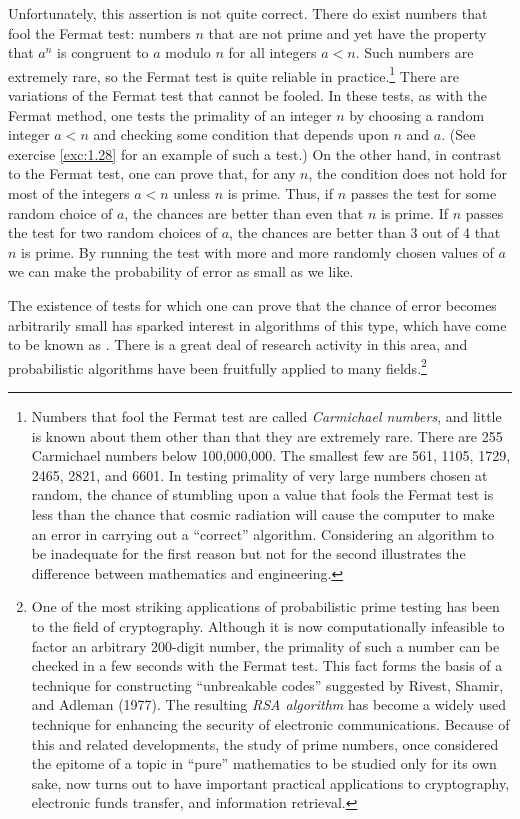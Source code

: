 Unfortunately, this assertion is not quite correct.  There do exist
numbers that fool the Fermat test: numbers $n$ that are not prime and
yet have the property that $a^n$ is congruent to $a$ modulo $n$ for
all integers $a < n$.  Such numbers are extremely rare, so the Fermat
test is quite reliable in practice.\footnote{\label{fn:1.47}Numbers
  that fool the Fermat test are called \textit{Carmichael numbers},
  and little is known about them other than that they are extremely
  rare.  There are 255 Carmichael numbers below 100,000,000.  The
  smallest few are 561, 1105, 1729, 2465, 2821, and 6601.  In testing
  primality of very large numbers chosen at random, the chance of
  stumbling upon a value that fools the Fermat test is less than the
  chance that cosmic radiation will cause the computer to make an
  error in carrying out a ``correct'' algorithm.  Considering an
  algorithm to be inadequate for the first reason but not for the
  second illustrates the difference between mathematics and
  engineering.}  There are variations of the Fermat test that cannot
be fooled.  In these tests, as with the Fermat method, one tests the
primality of an integer $n$ by choosing a random integer $a < n$ and
checking some condition that depends upon $n$ and $a$.  (See exercise
\ref{exc:1.28} for an example of such a test.)  On the other hand, in
contrast to the Fermat test, one can prove that, for any $n$, the
condition does not hold for most of the integers $a < n$ unless $n$ is
prime.  Thus, if $n$ passes the test for some random choice of $a$,
the chances are better than even that $n$ is prime.  If $n$ passes the
test for two random choices of $a$, the chances are better than 3 out
of 4 that $n$ is prime. By running the test with more and more
randomly chosen values of $a$ we can make the probability of error as
small as we like.

The existence of tests for which one can prove that the chance of
error becomes arbitrarily small has sparked interest in algorithms of
this type, which have come to be known as .  There is a great deal of research activity in this
area, and probabilistic algorithms have been fruitfully applied to
many fields.\footnote{One of the most striking applications of
  probabilistic prime testing has been to the field of cryptography.
  Although it is now computationally infeasible to factor an arbitrary
  200-digit number, the primality of such a number can be checked in a
  few seconds with the Fermat test.  This fact forms the basis of a
  technique for constructing ``unbreakable codes'' suggested by
  Rivest, Shamir, and Adleman (1977).  The resulting \textit{RSA
    algorithm} has become a widely used technique for enhancing the
  security of electronic communications.  Because of this and related
  developments, the study of prime numbers, once considered the
  epitome of a topic in ``pure'' mathematics to be studied only for
  its own sake, now turns out to have important practical applications
  to cryptography, electronic funds transfer, and information
  retrieval.}

